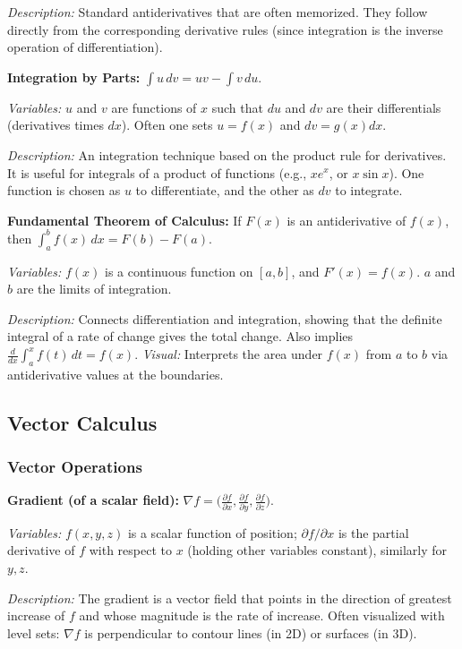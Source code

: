 \documentclass{article}
\begin{document}
\textit{Description:} Standard antiderivatives that are often memorized. They follow directly from the corresponding derivative rules (since integration is the inverse operation of differentiation).

\textbf{Integration by Parts:} $\displaystyle \int u\,dv = uv - \int v\,du$.

\textit{Variables:} $u$ and $v$ are functions of $x$ such that $du$ and $dv$ are their differentials (derivatives times $dx$). Often one sets $u=f(x)$ and $dv = g(x)dx$.

\textit{Description:} An integration technique based on the product rule for derivatives. It is useful for integrals of a product of functions (e.g., $x e^x$, or $x\sin x$). One function is chosen as $u$ to differentiate, and the other as $dv$ to integrate.

\textbf{Fundamental Theorem of Calculus:} If $F(x)$ is an antiderivative of $f(x)$, then $\displaystyle \int_{a}^{b} f(x)\,dx = F(b) - F(a)$.

\textit{Variables:} $f(x)$ is a continuous function on $[a,b]$, and $F'(x) = f(x)$. $a$ and $b$ are the limits of integration.

\textit{Description:} Connects differentiation and integration, showing that the definite integral of a rate of change gives the total change. Also implies $\frac{d}{dx}\int_{a}^{x} f(t)\,dt = f(x)$. \textit{Visual:} Interprets the area under $f(x)$ from $a$ to $b$ via antiderivative values at the boundaries.

\subsection*{Vector Calculus}

\subsubsection*{Vector Operations}

\textbf{Gradient (of a scalar field):} $\displaystyle \nabla f = \Big(\frac{\partial f}{\partial x}, \frac{\partial f}{\partial y}, \frac{\partial f}{\partial z}\Big)$.

\textit{Variables:} $f(x,y,z)$ is a scalar function of position; $\partial f/\partial x$ is the partial derivative of $f$ with respect to $x$ (holding other variables constant), similarly for $y, z$.

\textit{Description:} The gradient is a vector field that points in the direction of greatest increase of $f$ and whose magnitude is the rate of increase. Often visualized with level sets: $\nabla f$ is perpendicular to contour lines (in 2D) or surfaces (in 3D).
\end{document}
